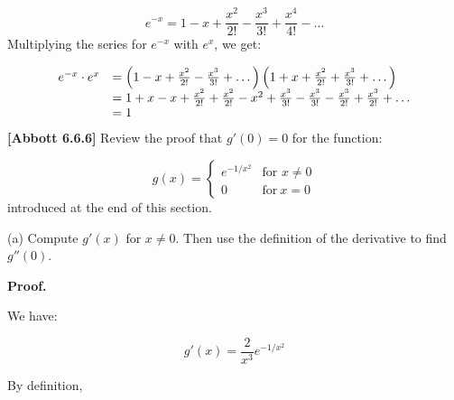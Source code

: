 \documentclass[10pt]{article}
\begin{document}
\begin{equation*}
e^{-x} =1-x+\frac{x^{2}}{2!} -\frac{x^{3}}{3!} +\frac{x^{4}}{4!} -\dotsc 
\end{equation*}
Multiplying the series for $\displaystyle e^{-x}$ with $\displaystyle e^{x}$, we get:




\begin{equation*}
\begin{array}{ c l }
e^{-x} \cdot e^{x} & =\left( 1-x+\frac{x^{2}}{2!} -\frac{x^{3}}{3!} +\dotsc \right)\left( 1+x+\frac{x^{2}}{2!} +\frac{x^{3}}{3!} +\dotsc \right)\\
 & =1+x-x+\frac{x^{2}}{2!} +\frac{x^{2}}{2!} -x^{2} +\frac{x^{3}}{3!} -\frac{x^{3}}{3!} -\frac{x^{3}}{2!} +\frac{x^{3}}{2!} +\dotsc \\
 & =1
\end{array}
\end{equation*}
\textbf{[Abbott 6.6.6]} Review the proof that $\displaystyle g'( 0) =0$ for the function:




\begin{equation*}
g( x) =\begin{cases}
e^{-1/x^{2}} & \text{for } x\neq 0\\
0 & \text{for} \ x=0
\end{cases}
\end{equation*}
introduced at the end of this section. 



(a) Compute $\displaystyle g'( x)$ for $\displaystyle x\neq 0$. Then use the definition of the derivative to find $\displaystyle g''( 0)$.



\textbf{Proof.}



We have:


\begin{equation*}
g'( x) =\frac{2}{x^{3}} e^{-1/x^{2}}
\end{equation*}


By definition,
\end{document}
